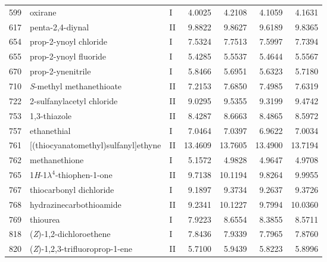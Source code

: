 \begin{longtable}{rlld{2.5}d{2.5}d{2.5}d{2.5}}
    599  & oxirane                                                & I  & 4.0025  & 4.2108  & 4.1059  & 4.1631  \\
    617  & penta-2,4-diynal                                       & II & 9.8822  & 9.8627  & 9.6189  & 9.8365  \\
    654  & prop-2-ynoyl chloride                                  & I  & 7.5324  & 7.7513  & 7.5997  & 7.7394  \\
    655  & prop-2-ynoyl fluoride                                  & I  & 5.4285  & 5.5537  & 5.4644  & 5.5567  \\
    670  & prop-2-ynenitrile                                      & I  & 5.8466  & 5.6951  & 5.6323  & 5.7180  \\
    710  & \textit{S}-methyl methanethioate                       & II & 7.2153  & 7.6850  & 7.4985  & 7.6319  \\
    722  & 2-sulfanylacetyl chloride                              & II & 9.0295  & 9.5355  & 9.3199  & 9.4742  \\
    753  & 1,3-thiazole                                           & II & 8.4287  & 8.6663  & 8.4865  & 8.5972  \\
    757  & ethanethial                                            & I  & 7.0464  & 7.0397  & 6.9622  & 7.0034  \\
    761  & [(thiocyanatomethyl)sulfanyl]ethyne                    & II & 13.4609 & 13.7605 & 13.4900 & 13.7194 \\
    762  & methanethione                                          & I  & 5.1572  & 4.9828  & 4.9647  & 4.9708  \\
    765  & 1\textit{H}-1$\lambda^4$-thiophen-1-one                & II & 9.7138  & 10.1194 & 9.8264  & 9.9955  \\
    767  & thiocarbonyl dichloride                                & I  & 9.1897  & 9.3734  & 9.2637  & 9.3726  \\
    768  & hydrazinecarbothioamide                                & II & 9.2341  & 10.1227 & 9.7994  & 10.0360 \\
    769  & thiourea                                               & I  & 7.9223  & 8.6554  & 8.3855  & 8.5711  \\
    818  & (\textit{Z})-1,2-dichloroethene                        & I  & 7.8436  & 7.9339  & 7.7965  & 7.8760  \\
    820  & (\textit{Z})-1,2,3-trifluoroprop-1-ene                 & II & 5.7100  & 5.9439  & 5.8223  & 5.8996  \\

\end{longtable}
